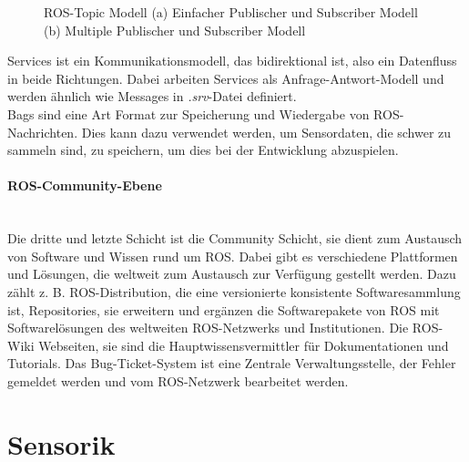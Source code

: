 \begin{figure}[H]
  \centering
  \qquad
  \caption{ROS-Topic Modell (a) Einfacher Publischer und Subscriber Modell (b) Multiple Publischer und Subscriber Modell \cite{RoboterMitRos.2020}}
  \label{fig:topicModell}
\end{figure}

Services ist ein Kommunikationsmodell, das bidirektional ist, also ein Datenfluss in beide Richtungen. Dabei arbeiten Services als Anfrage-Antwort-Modell und werden ähnlich wie Messages in \textit{.srv}-Datei definiert. \\
Bags sind eine Art Format zur Speicherung und Wiedergabe von ROS-Nachrichten. Dies kann dazu verwendet werden, um Sensordaten, die schwer zu sammeln sind, zu speichern, um dies bei der Entwicklung abzuspielen. \cite{ROSKonzept.2021, RoboterMitRos.2020}

\paragraph{ROS-Community-Ebene} \mbox{}\\
Die dritte und letzte Schicht ist die Community Schicht, sie dient zum Austausch von Software und Wissen rund um ROS. Dabei gibt es verschiedene Plattformen und Lösungen, die weltweit zum Austausch zur Verfügung gestellt werden. Dazu zählt z. B. ROS-Distribution, die eine versionierte konsistente Softwaresammlung ist, Repositories, sie erweitern und ergänzen die Softwarepakete von ROS mit Softwarelösungen des weltweiten ROS-Netzwerks und Institutionen. Die ROS-Wiki Webseiten, sie sind die Hauptwissensvermittler für Dokumentationen und Tutorials. Das Bug-Ticket-System ist eine Zentrale Verwaltungsstelle, der Fehler gemeldet werden und vom ROS-Netzwerk bearbeitet werden. \cite{ROSKonzept.2021}

\section{Sensorik}\label{subsec:Sensorik}

